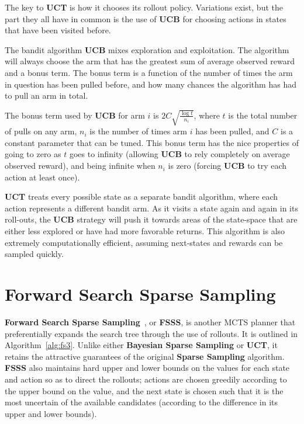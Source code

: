 The key to {\bf UCT} is how it chooses its rollout policy. Variations exist, but the part they all have in common is the use of {\bf UCB} for choosing actions in states that have been visited before.

The bandit algorithm {\bf UCB} mixes exploration and exploitation. The algorithm will always choose the arm that has the greatest sum of average observed reward and a bonus term. The bonus term is a function of the number of times the arm in question has been pulled before, and how many chances the algorithm has had to pull an arm in total.

The bonus term used by {\bf UCB} for arm $i$ is $2 C \sqrt{\frac{\log t}{n_i}}$, where $t$ is the total number of pulls on any arm, $n_i$ is the number of times arm $i$ has been pulled, and $C$ is a constant parameter that can be tuned. This bonus term has the nice properties of going to zero as $t$ goes to infinity (allowing {\bf UCB} to rely completely on average observed reward), and being infinite when $n_i$ is zero (forcing {\bf UCB} to try each action at least once).

{\bf UCT} treats every possible state as a separate bandit algorithm, where each action represents a different bandit arm. As it visits a state again and again in its roll-outs, the {\bf UCB} strategy will push it towards areas of the state-space that are either less explored or have had more favorable returns. This algorithm is also extremely computationally efficient, assuming next-states and rewards can be sampled quickly.

\section{Forward Search Sparse Sampling}

{\bf Forward Search Sparse Sampling}~\cite{walsh10}, or {\bf FSSS}, is another MCTS planner that preferentially expands the search tree through the use of rollouts. It is outlined in Algorithm~\ref{alg:fs3}. Unlike either {\bf Bayesian Sparse Sampling} or {\bf UCT}, it retains the attractive guarantees of the original {\bf Sparse Sampling} algorithm. {\bf FSSS} also maintains hard upper and lower bounds on the values for each state and action so as to direct the rollouts; actions are chosen greedily according to the upper bound on the value, and the next state is chosen such that it is the most uncertain of the available candidates (according to the difference in its upper and lower bounds).

